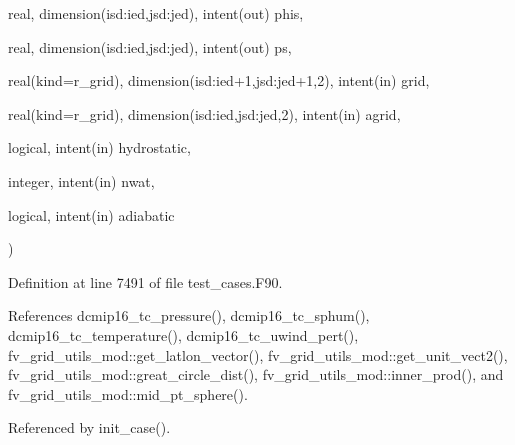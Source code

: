 {\begin{DoxyParamCaption}
\item[{real, dimension(isd\-:ied,jsd\-:jed), intent(out)}]{phis, }
\item[{real, dimension(isd\-:ied,jsd\-:jed), intent(out)}]{ps, }
\item[{real(kind=r\-\_\-grid), dimension(isd\-:ied+1,jsd\-:jed+1,2), intent(in)}]{grid, }
\item[{real(kind=r\-\_\-grid), dimension(isd\-:ied,jsd\-:jed,2), intent(in)}]{agrid, }
\item[{logical, intent(in)}]{hydrostatic, }
\item[{integer, intent(in)}]{nwat, }
\item[{logical, intent(in)}]{adiabatic}
\end{DoxyParamCaption}
)\hspace{0.3cm}{\ttfamily [private]}}\label{classtest__cases__mod_aefbd0cb99937da877c79d0f3e62c9e43}


Definition at line 7491 of file test\-\_\-cases.\-F90.



References dcmip16\-\_\-tc\-\_\-pressure(), dcmip16\-\_\-tc\-\_\-sphum(), dcmip16\-\_\-tc\-\_\-temperature(), dcmip16\-\_\-tc\-\_\-uwind\-\_\-pert(), fv\-\_\-grid\-\_\-utils\-\_\-mod\-::get\-\_\-latlon\-\_\-vector(), fv\-\_\-grid\-\_\-utils\-\_\-mod\-::get\-\_\-unit\-\_\-vect2(), fv\-\_\-grid\-\_\-utils\-\_\-mod\-::great\-\_\-circle\-\_\-dist(), fv\-\_\-grid\-\_\-utils\-\_\-mod\-::inner\-\_\-prod(), and fv\-\_\-grid\-\_\-utils\-\_\-mod\-::mid\-\_\-pt\-\_\-sphere().



Referenced by init\-\_\-case().

